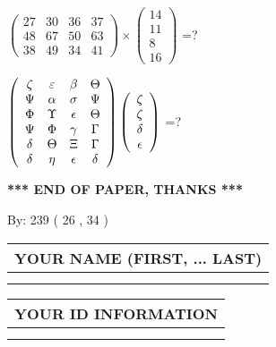 \documentclass[12pt]{article}
\begin{document}
  
 
$ \left( \begin{array}{ccccccccc}
 27  & 
 30  & 
 36  & 
 37  \\ 
 48  & 
 67  & 
 50  & 
 63  \\ 
 38  & 
 49  & 
 34  & 
 41
\end{array}\right) \times
\left( \begin{array}{c}
 14  \\ 
 11  \\ 
 8  \\ 
 16
\end{array}\right) $ =?
 
 
$  %
 \left( \begin{array}
 {
 c
 c
 c
 c
 }
                    \zeta & 
 \varepsilon & 
 \beta & 
 \Theta \\ 
 \Psi & 
 \alpha & 
 \sigma & 
 \Psi \\ 
 \Phi & 
 \Upsilon & 
 \epsilon & 
 \Theta \\ 
 \Psi & 
 \Phi & 
 \gamma & 
 \Gamma \\ 
 \delta & 
 \Theta & 
                    \Xi & 
 \Gamma \\ 
 \delta & 
 \eta & 
 \epsilon & 
 \delta
 \end{array} \right)
 \left( \begin{array}
 {
 c
 }
                    \zeta \\ 
                    \zeta \\ 
 \delta \\ 
 \epsilon
 \end{array} \right)
$ =?
 

 

 
\vspace{0.3in}
   
   
 \vspace{0.2in}
 
   
   
   
   
\vspace{1.0in} 
{\textbf{\large{ *** END OF PAPER, THANKS *** }}} 
   
   
\hspace{1.0in} By: 
 239 ( 26 ,  34 )
   
   
   
   
\newpage 
\setcounter{page}{ 
    30001 } 
   
   
   
   
\noindent\begin{tabular}{|l|}
\hline
YOUR NAME (FIRST, ... LAST)  \\
\hline
 \\ 
 \\ 
\hline
\end{tabular}
\hspace{0.05in} \begin{tabular}{|l|}
\hline
 YOUR   ID   INFORMATION  \\
\hline
 \\ 
 \\ 
\hline
\end{tabular}
   
\end{document}
